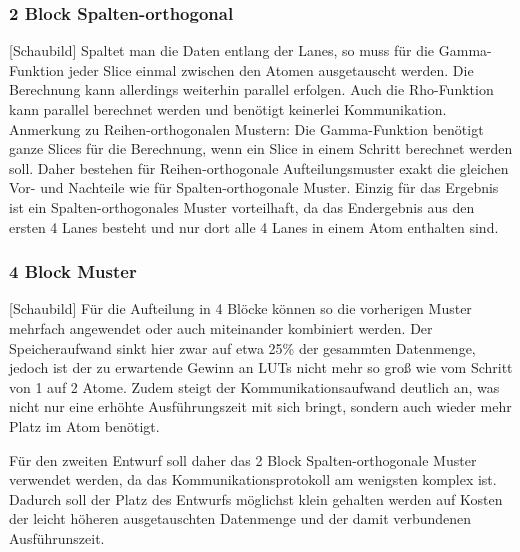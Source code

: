 \subsubsection{2 Block Spalten-orthogonal}
[Schaubild]
Spaltet man die Daten entlang der Lanes, so muss für die Gamma-Funktion jeder Slice einmal zwischen den Atomen ausgetauscht werden. Die Berechnung kann allerdings weiterhin parallel erfolgen.
Auch die Rho-Funktion kann parallel berechnet werden und benötigt keinerlei Kommunikation.
Anmerkung zu Reihen-orthogonalen Mustern:
Die Gamma-Funktion benötigt ganze Slices für die Berechnung, wenn ein Slice in einem Schritt berechnet werden soll. Daher bestehen für Reihen-orthogonale Aufteilungsmuster exakt die gleichen
Vor- und Nachteile wie für Spalten-orthogonale Muster.
Einzig für das Ergebnis ist ein Spalten-orthogonales Muster vorteilhaft, da das Endergebnis aus den ersten 4 Lanes besteht und nur dort alle 4 Lanes in einem Atom enthalten sind.

\subsubsection{4 Block Muster}
[Schaubild]
Für die Aufteilung in 4 Blöcke können so die vorherigen Muster mehrfach angewendet oder auch miteinander kombiniert werden.
Der Speicheraufwand sinkt hier zwar auf etwa 25\% der gesammten Datenmenge, jedoch ist der zu erwartende Gewinn an LUTs nicht mehr so groß wie vom Schritt von 1 auf 2 Atome.
Zudem steigt der Kommunikationsaufwand deutlich an, was nicht nur eine erhöhte Ausführungszeit mit sich bringt, sondern auch wieder mehr Platz im Atom benötigt.

Für den zweiten Entwurf soll daher das 2 Block Spalten-orthogonale Muster verwendet werden, da das Kommunikationsprotokoll am wenigsten komplex ist.
Dadurch soll der Platz des Entwurfs möglichst klein gehalten werden auf Kosten der leicht höheren ausgetauschten Datenmenge und der damit verbundenen Ausführunszeit.
 

